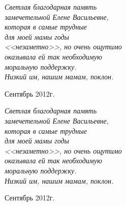\documentclass[utf8x, 12pt, a5paper]{G7-32a} %
\begin{document}
\frontmatter %


\thispagestyle{empty} 


\noindent

\begin{center}

{\itshape
Светлая благодарная память \\ замечетельной Елене Васильевне,\\
которая в самые трудные\\ для моей мамы годы \\ <<незаметно>>, но очень ощутимо \\
оказывала ей так необходимую \\ моральную поддержку.\\
Низкий им, нашим мамам, поклон.

}

\end{center}
\indent

\indent

\noindent
Сентябрь 2012г.

 
\newpage

\noindent

\begin{center}

{\itshape
Светлая благодарная память \\ замечетельной Елене Васильевне,\\
которая в самые трудные\\ для моей мамы годы \\ <<незаметно>>, но очень ощутимо \\
оказывала ей так необходимую \\ моральную поддержку.\\
Низкий им, нашим мамам, поклон.

}

\end{center}
\indent

\indent

\noindent
Сентябрь 2012г.
 
\mainmatter %



\backmatter %



\appendix   %
\end{document}
